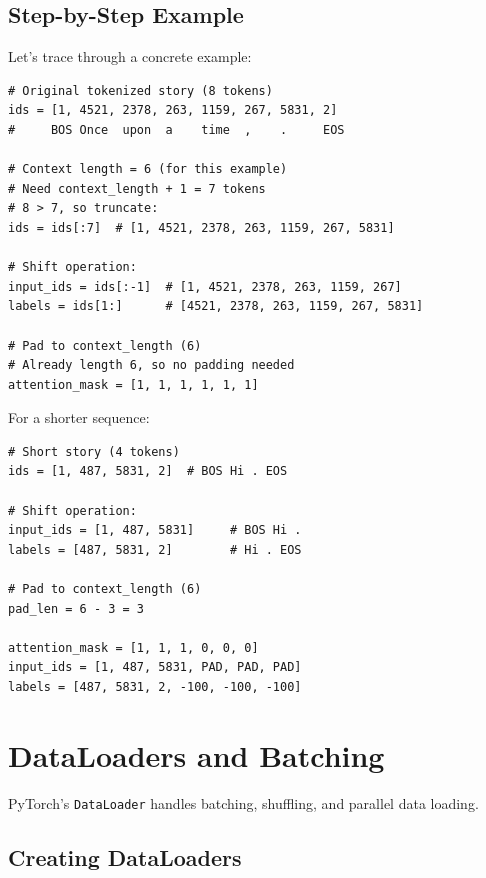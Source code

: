 \subsection{Step-by-Step Example}

Let's trace through a concrete example:

\begin{lstlisting}[style=python]
# Original tokenized story (8 tokens)
ids = [1, 4521, 2378, 263, 1159, 267, 5831, 2]
#     BOS Once  upon  a    time  ,    .     EOS

# Context length = 6 (for this example)
# Need context_length + 1 = 7 tokens
# 8 > 7, so truncate:
ids = ids[:7]  # [1, 4521, 2378, 263, 1159, 267, 5831]

# Shift operation:
input_ids = ids[:-1]  # [1, 4521, 2378, 263, 1159, 267]
labels = ids[1:]      # [4521, 2378, 263, 1159, 267, 5831]

# Pad to context_length (6)
# Already length 6, so no padding needed
attention_mask = [1, 1, 1, 1, 1, 1]
\end{lstlisting}

For a shorter sequence:
\begin{lstlisting}[style=python]
# Short story (4 tokens)
ids = [1, 487, 5831, 2]  # BOS Hi . EOS

# Shift operation:
input_ids = [1, 487, 5831]     # BOS Hi .
labels = [487, 5831, 2]        # Hi . EOS

# Pad to context_length (6)
pad_len = 6 - 3 = 3

attention_mask = [1, 1, 1, 0, 0, 0]
input_ids = [1, 487, 5831, PAD, PAD, PAD]
labels = [487, 5831, 2, -100, -100, -100]
\end{lstlisting}

\section{DataLoaders and Batching}

PyTorch's \texttt{DataLoader} handles batching, shuffling, and parallel data loading.

\subsection{Creating DataLoaders}

